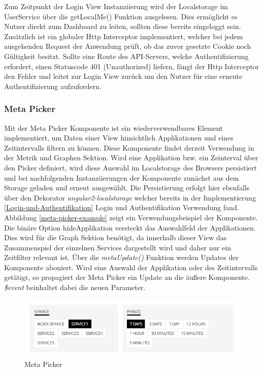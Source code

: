 Zum Zeitpunkt der Login View Instanziierung wird der Localstorage im UserService über die getLocalMe() Funktion ausgelesen.
Dies ermöglicht es Nutzer direkt zum Dashboard zu leiten, sollten diese bereits eingeloggt sein.
Zusätzlich ist ein globaler Http Interceptor implementiert, welcher bei jedem ausgehenden Request der Anwendung prüft, ob das zuvor gesetzte Cookie noch Gültigkeit besitzt.
Sollte eine Route des \ac{API}-Servers, welche Authentifizierung erfordert, einen Statuscode 401 (Unauthorized) liefern,
fängt der Http Interceptor den Fehler und leitet zur Login View zurück um den Nutzer für eine erneute Authentifizierung aufzufordern.




\subsubsection{Meta Picker}

Mit der Meta Picker Komponente ist ein wiederverwendbares Element implementiert, um Daten einer View hinsichtlich Applikationen und eines Zeitintervalls filtern zu können.
Diese Komponente findet derzeit Verwendung in der Metrik und Graphen Sektion. Wird eine Applikation bzw. ein Zeinterval über den Picker definiert,
wird diese Auswahl im Localstorage des Browsers persistiert und bei nachfolgenden Instanziierungen der Komponente zunächst aus dem Storage geladen und erneut ausgewählt.
Die Persistierung erfolgt hier ebenfalls über den Dekorator \emph{angular2-localstorage}
welcher bereits in der Implementierung \ref{Login-und-Authentifikation} Login und Authentifikation Verwendung fand.
Abbildung \ref{meta-picker-example} zeigt ein Verwendungsbeispiel der Komponente.
Die binäre Option hideApplikation versteckt das Auswahlfeld der Applikationen. Dies wird für die Graph Sektion benötigt,
da innerhalb dieser View das Zusammenspiel der einzelnen Services dargestellt wird und daher nur ein Zeitfilter relevant ist.
Über die \emph{metaUpdate()} Funktion werden Updates der Komponente aboniert. Wird eine Auswahl der Applikation oder des Zeitintervalls getätigt,
so propagiert der Meta Picker ein Update an die äußere Komponente. \emph{\$event} beinhaltet dabei die neuen Parameter.





\begin{figure}[hptb]
 \centering
 \includegraphics[width=\linewidth]{kapitel4/metapicker.jpg}
 \caption{Meta Picker}
 \label{metapicker}
\end{figure}
\vspace{0.3cm}



